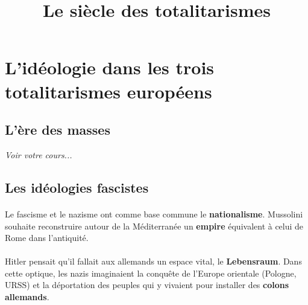 \documentclass[12pt]{article}
\title{\textbf{Le siècle des totalitarismes}}
\date{}
\renewcommand{\emph}{\textbf}
\begin{document}
\maketitle

\section{}
\section{}
\section{L'idéologie dans les trois totalitarismes européens}

\subsection{L'ère des masses}

\textit{Voir votre cours...}

\subsection{Les idéologies fascistes}

\paragraph{}
Le fascisme et le nazisme ont comme base commune le \emph{nationalisme}. Mussolini souhaite reconstruire autour de la Méditerranée un \emph{empire} équivalent à celui de Rome dans l'antiquité.

\paragraph{}
Hitler pensait qu'il fallait aux allemands un espace vital, le \emph{Lebensraum}. Dans cette optique, les nazis imaginaient la conquête de l'Europe orientale (Pologne, URSS) et la déportation des peuples qui y vivaient pour installer des \emph{colons allemands}.
\end{document}
